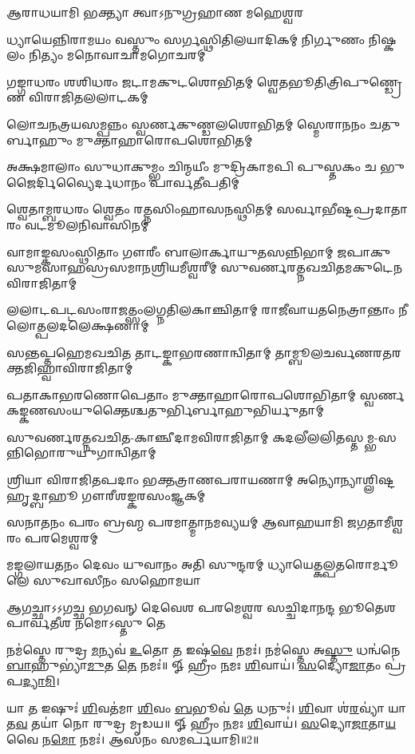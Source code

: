 {𑌆𑌰𑌾𑌧𑌯𑌾𑌮𑌿 𑌭𑌕𑍍𑌤𑍍𑌯𑌾 𑌤𑍍𑌵𑌾𑌽𑌨𑍁𑌗𑍍𑌰𑌹𑌾𑌣 𑌮𑌹𑍇𑌶𑍍𑌵𑌰}



\twolineshloka
{𑌧𑍍𑌯𑌾𑌯𑍇𑌨𑍍𑌨𑌿𑌰𑌾𑌮𑌯𑌂 𑌵𑌸𑍍𑌤𑍁𑌂 𑌸𑌰𑍍𑌗𑌸𑍍𑌥𑌿𑌤𑌿𑌲𑌯𑌾𑌦𑌿𑌕𑌮𑍍}
{𑌨𑌿𑌰𑍍𑌗𑍁𑌣𑌂 𑌨𑌿𑌷𑍍𑌕𑌲𑌂 𑌨𑌿𑌤𑍍𑌯𑌂 𑌮𑌨𑍋𑌵𑌾𑌚𑌾𑌮𑌗𑍋𑌚𑌰𑌮𑍍}

\twolineshloka
{𑌗𑌙𑍍𑌗𑌾𑌧𑌰𑌂 𑌶𑌶𑌿𑌧𑌰𑌂 𑌜𑌟𑌾𑌮𑌕𑍁𑌟𑌶𑍋𑌭𑌿𑌤𑌮𑍍}
{𑌶𑍍𑌵𑍇𑌤𑌭𑍂𑌤𑌿𑌤𑍍𑌰𑌿𑌪𑍁𑌣𑍍𑌡𑍍𑌰𑍇𑌣 𑌵𑌿𑌰𑌾𑌜𑌿𑌤𑌲𑌲𑌾𑌟𑌕𑌮𑍍}

\twolineshloka
{𑌲𑍋𑌚𑌨𑌤𑍍𑌰𑌯𑌸𑌮𑍍𑌪𑌨𑍍𑌨𑌂 𑌸𑍍𑌵𑌰𑍍𑌣𑌕𑍁𑌣𑍍𑌡𑌲𑌶𑍋𑌭𑌿𑌤𑌮𑍍}
{𑌸𑍍𑌮𑍇𑌰𑌾𑌨𑌨𑌂 𑌚𑌤𑍁𑌰𑍍𑌬𑌾𑌹𑍁𑌂 𑌮𑍁𑌕𑍍𑌤𑌾𑌹𑌾𑌰𑍋𑌪𑌶𑍋𑌭𑌿𑌤𑌮𑍍}

\twolineshloka
{𑌅𑌕𑍍𑌷𑌮𑌾𑌲𑌾𑌂 𑌸𑍁𑌧𑌾𑌕𑍁𑌮𑍍𑌭𑌂 𑌚𑌿𑌨𑍍𑌮𑌯𑍀𑌂 𑌮𑍁𑌦𑍍𑌰𑌿𑌕𑌾𑌮𑌪𑌿}
{𑌪𑍁𑌸𑍍𑌤𑌕𑌂 𑌚 𑌭𑍁𑌜𑍈𑌰𑍍𑌦𑌿𑌵𑍍𑌯𑍈𑌰𑍍𑌦𑌧𑌾𑌨𑌂 𑌪𑌾𑌰𑍍𑌵𑌤𑍀𑌪𑌤𑌿𑌮𑍍}

\twolineshloka
{𑌶𑍍𑌵𑍇𑌤𑌾𑌮𑍍𑌬𑌰𑌧𑌰𑌂 𑌶𑍍𑌵𑍇𑌤𑌂 𑌰𑌤𑍍𑌨𑌸𑌿𑌂𑌹𑌾𑌸𑌨𑌸𑍍𑌥𑌿𑌤𑌮𑍍}
{𑌸𑌰𑍍𑌵𑌾𑌭𑍀𑌷𑍍𑌟𑌪𑍍𑌰𑌦𑌾𑌤𑌾𑌰𑌂 𑌵𑌟𑌮𑍂𑌲𑌨𑌿𑌵𑌾𑌸𑌿𑌨𑌮𑍍}

\threelineshloka
{𑌵𑌾𑌮𑌾𑌙𑍍𑌕𑌸𑌂𑌸𑍍𑌥𑌿𑌤𑌾𑌂 𑌗𑍗𑌰𑍀𑌂 𑌬𑌾𑌲𑌾𑌰𑍍𑌕𑌾𑌯𑍁𑌤𑌸𑌨𑍍𑌨𑌿𑌭𑌾𑌮𑍍}
{𑌜𑌪𑌾𑌕𑍁𑌸𑍁𑌮𑌸𑌾𑌹𑌸𑍍𑌰𑌸𑌮𑌾𑌨𑌶𑍍𑌰𑌿𑌯𑌮𑍀𑌶𑍍𑌵𑌰𑍀𑌮𑍍}
{𑌸𑍁𑌵𑌰𑍍𑌣𑌰𑌤𑍍𑌨𑌖𑌚𑌿𑌤𑌮𑌕𑍁𑌟𑍇𑌨 𑌵𑌿𑌰𑌾𑌜𑌿𑌤𑌾𑌮𑍍}

\twolineshloka
{𑌲𑌲𑌾𑌟𑌪𑌟𑍍𑌟𑌸𑌂𑌰𑌾𑌜𑌤𑍍𑌸𑌂𑌲𑌗𑍍𑌨𑌤𑌿𑌲𑌕𑌾𑌞𑍍𑌚𑌿𑌤𑌾𑌮𑍍}
{𑌰𑌾𑌜𑍀𑌵𑌾𑌯𑌤𑌨𑍇𑌤𑍍𑌰𑌾𑌨𑍍𑌤𑌾𑌂 𑌨𑍀𑌲𑍋𑌤𑍍𑌪𑌲𑌦𑌲𑍇𑌕𑍍𑌷𑌣𑌾𑌮𑍍}

\twolineshloka
{𑌸𑌨𑍍𑌤𑌪𑍍𑌤𑌹𑍇𑌮𑌖𑌚𑌿𑌤 𑌤𑌾𑌟𑌙𑍍𑌕𑌾𑌭𑌰𑌣𑌾𑌨𑍍𑌵𑌿𑌤𑌾𑌮𑍍}
{𑌤𑌾𑌮𑍍𑌬𑍂𑌲𑌚𑌰𑍍𑌵𑌣𑌰𑌤𑌰𑌕𑍍𑌤𑌜𑌿𑌹𑍍𑌵𑌾𑌵𑌿𑌰𑌾𑌜𑌿𑌤𑌾𑌮𑍍}

\twolineshloka
{𑌪𑌤𑌾𑌕𑌾𑌭𑌰𑌣𑍋𑌪𑍇𑌤𑌾𑌂 𑌮𑍁𑌕𑍍𑌤𑌾𑌹𑌾𑌰𑍋𑌪𑌶𑍋𑌭𑌿𑌤𑌾𑌮𑍍}
{𑌸𑍍𑌵𑌰𑍍𑌣𑌕𑌙𑍍𑌕𑌣𑌸𑌂𑌯𑍁𑌕𑍍𑌤𑍈𑌶𑍍𑌚𑌤𑍁𑌰𑍍𑌭𑌿𑌰𑍍𑌬𑌾𑌹𑍁𑌭𑌿𑌰𑍍𑌯𑍁𑌤𑌾𑌮𑍍}

\twolineshloka
{𑌸𑍁𑌵𑌰𑍍𑌣𑌰𑌤𑍍𑌨𑌖𑌚𑌿𑌤-𑌕𑌾𑌞𑍍𑌚𑍀𑌦𑌾𑌮𑌵𑌿𑌰𑌾𑌜𑌿𑌤𑌾𑌮𑍍}
{𑌕𑌦𑌲𑍀𑌲𑌲𑌿𑌤𑌸𑍍𑌤𑌮𑍍𑌭-𑌸𑌨𑍍𑌨𑌿𑌭𑍋𑌰𑍁𑌯𑍁𑌗𑌾𑌨𑍍𑌵𑌿𑌤𑌾𑌮𑍍}

\twolineshloka
{𑌶𑍍𑌰𑌿𑌯𑌾 𑌵𑌿𑌰𑌾𑌜𑌿𑌤𑌪𑌦𑌾𑌂 𑌭𑌕𑍍𑌤𑌤𑍍𑌰𑌾𑌣𑌪𑌰𑌾𑌯𑌣𑌾𑌮𑍍}
{𑌅𑌨𑍍𑌯𑍋𑌨𑍍𑌯𑌾𑌶𑍍𑌲𑌿𑌷𑍍𑌟𑌹𑍃𑌦𑍍𑌬𑌾𑌹𑍂 𑌗𑍗𑌰𑍀𑌶𑌙𑍍𑌕𑌰𑌸𑌂𑌜𑍍𑌞𑌕𑌮𑍍}

\twolineshloka
{𑌸𑌨𑌾𑌤𑌨𑌂 𑌪𑌰𑌂 𑌬𑍍𑌰𑌹𑍍𑌮 𑌪𑌰𑌮𑌾𑌤𑍍𑌮𑌾𑌨𑌮𑌵𑍍𑌯𑌯𑌮𑍍}
{𑌆𑌵𑌾𑌹𑌯𑌾𑌮𑌿 𑌜𑌗𑌤𑌾𑌮𑍀𑌶𑍍𑌵𑌰𑌂 𑌪𑌰𑌮𑍇𑌶𑍍𑌵𑌰𑌮𑍍}

\twolineshloka
{𑌮𑌙𑍍𑌗𑌲𑌾𑌯𑌤𑌨𑌂 𑌦𑍇𑌵𑌂 𑌯𑍁𑌵𑌾𑌨𑌂 𑌅𑌤𑌿 𑌸𑍁𑌨𑍍𑌦𑌰𑌮𑍍}
{𑌧𑍍𑌯𑌾𑌯𑍇𑌤𑍍𑌕𑌲𑍍𑌪𑌤𑌰𑍋𑌰𑍍𑌮𑍂𑌲𑍇 𑌸𑍁𑌖𑌾𑌸𑍀𑌨𑌂 𑌸𑌹𑍋𑌮𑌯𑌾}

\twolineshloka
{𑌆𑌗𑌚𑍍𑌛𑌾𑌽𑌽𑌗𑌚𑍍𑌛 𑌭𑌗𑌵𑌨𑍍 𑌦𑍇𑌵𑍇𑌶 𑌪𑌰𑌮𑍇𑌶𑍍𑌵𑌰}
{𑌸𑌚𑍍𑌚𑌿𑌦𑌾𑌨𑌨𑍍𑌦 𑌭𑍂𑌤𑍇𑌶 𑌪𑌾𑌰𑍍𑌵𑌤𑍀𑌶 𑌨𑌮𑍋𑌽𑌸𑍍𑌤𑍁 𑌤𑍇}

{\small \closesection}



𑌨𑌮॑𑌸𑍍𑌤𑍇 𑌰𑍁𑌦𑍍𑌰 \ul{𑌮}𑌨𑍍𑌯𑌵॑ \ul{𑌉}𑌤𑍋 \ul{𑌤} 𑌇𑌷॑\ul{𑌵𑍇} 𑌨𑌮𑌃॑। 𑌨𑌮॑𑌸𑍍𑌤𑍇 𑌅\ul{𑌸𑍍𑌤𑍁} 𑌧𑌨𑍍𑌵॑𑌨𑍇 \ul{𑌬𑌾}𑌹𑍁𑌭𑍍𑌯𑌾॑\ul{𑌮𑍁}𑌤 \ul{𑌤𑍇} 𑌨𑌮𑌃॑॥ 𑍐 𑌹𑍍𑌰𑍀𑌂 \ul{𑌨}𑌮𑌃 \ul{𑌶𑌿}𑌵𑌾𑌯॑। \ul{𑌸}𑌦𑍍𑌯𑍋\ul{𑌜𑌾}𑌤𑌂 𑌪𑍍𑌰॑𑌪\ul{𑌦𑍍𑌯𑌾}\ul{𑌮𑌿}।

𑌯𑌾 \ul{𑌤} 𑌇𑌷𑍁𑌃॑ \ul{𑌶𑌿}𑌵𑌤॑𑌮𑌾 \ul{𑌶𑌿}𑌵𑌂 \ul{𑌬}𑌭𑍂𑌵॑ \ul{𑌤𑍇} 𑌧𑌨𑍁𑌃॑। \ul{𑌶𑌿}𑌵𑌾 𑌶॑\ul{𑌰}𑌵𑍍𑌯𑌾॑ 𑌯𑌾 𑌤\ul{𑌵} 𑌤𑌯𑌾॑ 𑌨𑍋 𑌰𑍁𑌦𑍍𑌰 𑌮𑍃𑌡𑌯॥ 𑍐 𑌹𑍍𑌰𑍀𑌂 \ul{𑌨}𑌮𑌃 \ul{𑌶𑌿}𑌵𑌾𑌯॑। \ul{𑌸}𑌦𑍍𑌯𑍋\ul{𑌜𑌾}𑌤𑌾\ul{𑌯} 𑌵𑍈 𑌨\ul{𑌮𑍋} 𑌨𑌮𑌃॑। 𑌆𑌸𑌨𑌂 𑌸𑌮𑌰𑍍𑌪𑌯𑌾𑌮𑌿॥2॥

